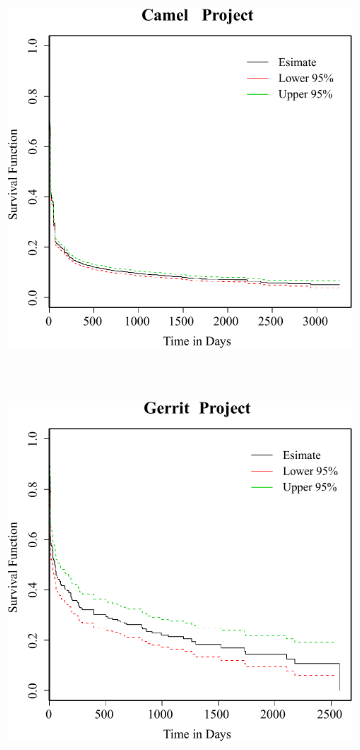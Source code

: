 \begin{figure}[t]
	\centering
	
	\begin{subfigure}[b]{0.31\textwidth}
		\includegraphics[width=\textwidth]{sur_camel.pdf}
	\end{subfigure}
	~
	~
	\begin{subfigure}[b]{0.31\textwidth}
		\includegraphics[width=\textwidth]{sur_gerrit.pdf}

\end{subfigure}
\end{figure}
